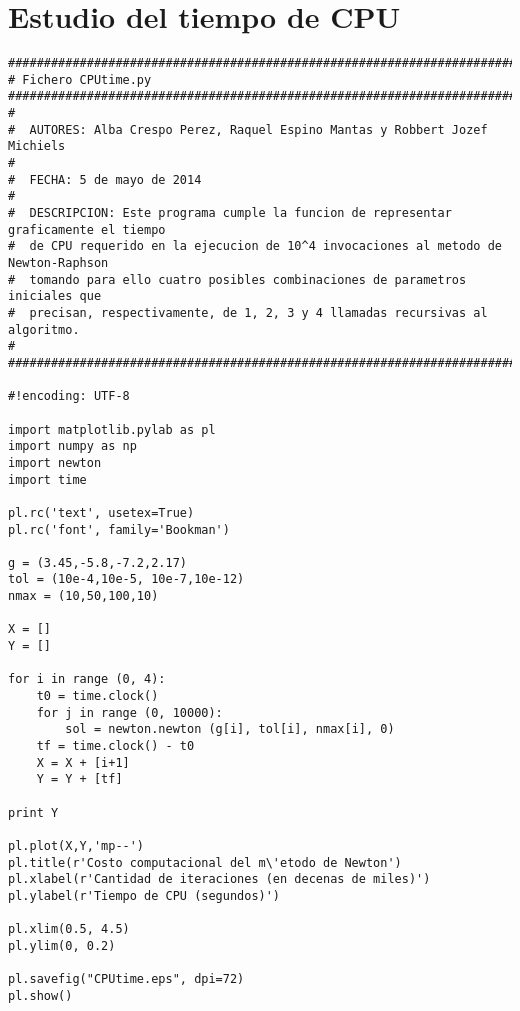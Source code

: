 \section{Estudio del tiempo de CPU}
\label{Apendice2:label3}

\begin{center}
\begin{footnotesize}

\begin{verbatim}
#######################################################################################
# Fichero CPUtime.py
#######################################################################################
#
#  AUTORES: Alba Crespo Perez, Raquel Espino Mantas y Robbert Jozef Michiels
#   
#  FECHA: 5 de mayo de 2014
#
#  DESCRIPCION: Este programa cumple la funcion de representar graficamente el tiempo
#  de CPU requerido en la ejecucion de 10^4 invocaciones al metodo de Newton-Raphson
#  tomando para ello cuatro posibles combinaciones de parametros iniciales que 
#  precisan, respectivamente, de 1, 2, 3 y 4 llamadas recursivas al algoritmo.
#
#######################################################################################

#!encoding: UTF-8

import matplotlib.pylab as pl
import numpy as np
import newton
import time

pl.rc('text', usetex=True)
pl.rc('font', family='Bookman')

g = (3.45,-5.8,-7.2,2.17)
tol = (10e-4,10e-5, 10e-7,10e-12)
nmax = (10,50,100,10)

X = []
Y = []

for i in range (0, 4):
    t0 = time.clock()
    for j in range (0, 10000):
        sol = newton.newton (g[i], tol[i], nmax[i], 0)
    tf = time.clock() - t0
    X = X + [i+1]
    Y = Y + [tf]

print Y

pl.plot(X,Y,'mp--')
pl.title(r'Costo computacional del m\'etodo de Newton') 
pl.xlabel(r'Cantidad de iteraciones (en decenas de miles)')
pl.ylabel(r'Tiempo de CPU (segundos)')

pl.xlim(0.5, 4.5)
pl.ylim(0, 0.2)

pl.savefig("CPUtime.eps", dpi=72)
pl.show()

\end{verbatim}

\end{footnotesize}
\end{center}

